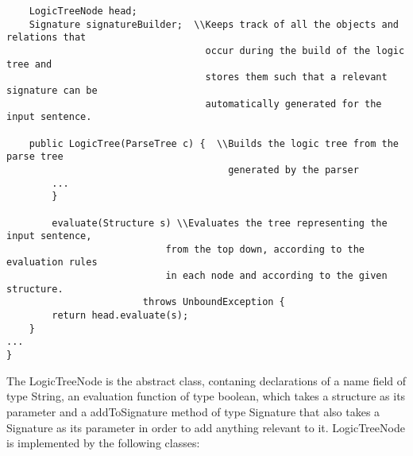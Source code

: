 \documentclass{article}
\begin{document}
\begin{enumerate}
\begin{verbatim}
    LogicTreeNode head;					
    Signature signatureBuilder;  \\Keeps track of all the objects and relations that
                                   occur during the build of the logic tree and
                                   stores them such that a relevant signature can be
                                   automatically generated for the input sentence.

    public LogicTree(ParseTree c) {  \\Builds the logic tree from the parse tree
                                       generated by the parser
	    ...
	    }

	    evaluate(Structure s) \\Evaluates the tree representing the input sentence, 
                            from the top down, according to the evaluation rules 
                            in each node and according to the given structure.
			            throws UnboundException {
        return head.evaluate(s);
    }
...
}

\end{verbatim}

\noindent The LogicTreeNode is the abstract class, contaning declarations of a name field of type String, an evaluation function of type boolean, which takes a structure as its parameter and a addToSignature method of type Signature that also takes a Signature as its parameter in order to add anything relevant to it. LogicTreeNode is implemented by the following classes:



\end{enumerate}
\end{document}
